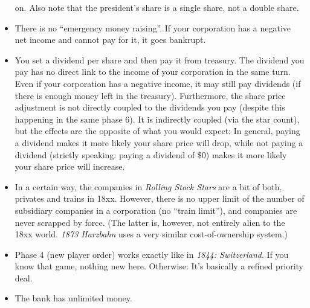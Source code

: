 \documentclass[10pt,final]{report}
\begin{document}
\begin{multicols}{2}
\begin{itemize}
  on. Also note that the president's share is a single share, not a
  double share.
\item There is no ``emergency money raising''. If your corporation
  has a negative net income and cannot pay for it, it goes bankrupt.
\item You set a dividend per share and then pay it from treasury. The
  dividend you pay has no direct link to the income of your
  corporation in the same turn. Even if your corporation has a
  negative income, it may still pay dividends (if there is enough
  money left in the treasury). Furthermore, the share price adjustment is
  not directly coupled to the dividends you pay (despite this happening
  in the same phase 6). It is indirectly coupled (via the star count),
  but the effects are the opposite of what you would expect: In
  general, paying a dividend makes it more likely your share
  price will drop, while not paying a dividend (strictly speaking:
  paying a dividend of \$0) makes it more likely your share price
  will increase.
\item In a certain way, the companies in \emph{Rolling Stock Stars}
  are a bit of both, privates and trains in 18xx. However, there is no
  upper limit of the number of subsidiary companies in a corporation
  (no ``train limit''), and companies are never scrapped by
  force. (The latter is, however, not entirely alien to the 18xx
  world. \emph{1873 Harzbahn} uses a very similar cost-of-ownership
  system.)
\item Phase 4 (new player order) works exactly like in \emph{1844:
    Switzerland}. If you know that game, nothing new here. Otherwise:
  It's basically a refined priority deal.
\item The bank has unlimited money.
\end{itemize}


\end{multicols}
\end{document}
